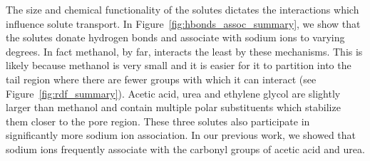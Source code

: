 \documentclass[journal=jpcbfk,manuscript=article]{achemso}
\begin{document}
  The size and chemical functionality of the solutes dictates the interactions which
  influence solute transport. In Figure~\ref{fig:hbonds_assoc_summary}, we show that the
  solutes donate hydrogen bonds and associate with sodium ions to varying degrees.
  In fact methanol, by far, interacts the least by these mechanisms. This is likely 
  because methanol is very small and it is easier for it to partition into the tail
  region where there are fewer groups with which it can interact (see Figure~\ref{fig:rdf_summary}).
  Acetic acid, urea and ethylene glycol are slightly larger than methanol and contain 
  multiple polar substituents which stabilize them closer to the pore region.
  These three solutes also participate in significantly more sodium ion association. 
  In our previous work, we showed that sodium ions frequently associate with the 
  carbonyl groups of acetic acid and urea.
  
\end{document}
